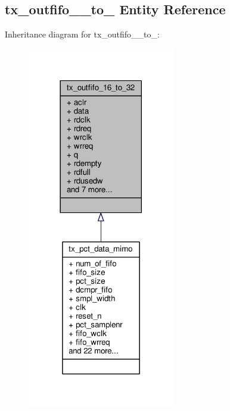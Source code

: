 \subsection{tx\+\_\+outfifo\+\_\+\_\+to\+\_ Entity Reference}
\label{classtx__outfifo__16__to__32}


Inheritance diagram for tx\+\_\+outfifo\+\_\+\_\+to\+\_\+:\nopagebreak
\begin{figure}[H]
\begin{center}
\leavevmode
\includegraphics[width=182pt]{d3/d8e/classtx__outfifo__16__to__32__inherit__graph}
\end{center}
\end{figure}


